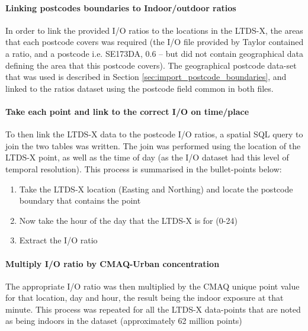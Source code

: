             \paragraph{Linking postcodes boundaries to Indoor/outdoor ratios}
            \label{sec:linking_postcodes_to_ratios}

In order to link the provided I/O ratios to the locations in the LTDS-X, the areas that each postcode covers was required (the I/O file provided by Taylor contained a ratio, and a postcode i.e. SE173DA, 0.6 -- but did not contain geographical data defining the area that this postcode covers). The geographical postcode data-set that was used is described in Section \ref{sec:import_postcode_boundaries}, and linked to the ratios dataset using the postcode field common in both files.

            \paragraph{Take each point and link to the correct I/O on time/place}
            \label{sec:linking_points_to_postcode_ratios}

To then link the LTDS-X data to the postcode I/O ratios, a spatial SQL query to join the two tables was written. The join was performed using the location of the LTDS-X point, as well as the time of day (as the I/O dataset had this level of temporal resolution). This process is summarised in the bullet-points below:

\begin{enumerate}
\item Take the LTDS-X location (Easting and Northing) and locate the postcode boundary that contains the point
\item Now take the hour of the day that the LTDS-X is for (0-24)
\item Extract the I/O ratio
\end{enumerate}

            \paragraph{Multiply I/O ratio by CMAQ-Urban concentration}
            \label{sec:multiple_io_by_cmaq}

The appropriate I/O ratio was then multiplied by the CMAQ unique point value for that location, day and hour, the result being the indoor exposure at that minute. This process was repeated for all the LTDS-X data-points that are noted as being indoors in the dataset (approximately 62 million points)

